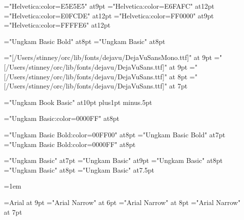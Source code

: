 


\font\hveee="Helvetica:color=E5E5E5" at9pt
\font\hveff="Helvetica:color=E6FAFC" at12pt
\font\hvefd="Helvetica:color=E0FCDE" at12pt
\font\hvfee="Helvetica:color=FF0000" at9pt
\font\hvffe="Helvetica:color=FFFFE6" at12pt

\let\seq\relax
\let\lname\relax
\let\sname\relax
\let\uname\relax
\let\chars\relax
\let\names\relax
\let\glyph\relax
\let\rglyf\relax
\let\image\relax
\let\notes\relax
\let\stags\relax
\let\fseq\relax
\let\fseqc\relax
\let\fseqh\relax
\let\sqdbcun\relax
\let\sqdbpua\relax
\let\sqseq\relax
\let\sqinv\relax
\let\sqchr\relax

\let\imagefloat\relax
\let\imagecaption\relax

\def\ucode#1{\sf\eight\rm}

\let\remfor\relax
\let\Hhhhh\relax

\let\glyf\relax
\let\fchr\relax
\let\fhex\relax
\let\dist\relax
\let\rhex\relax

\let\sl\relax
\let\slc\relax
\let\slcc\relax
\let\cdligh\relax
\let\zatu\relax
\def\diffc{\let\ofspc\relax\pcfee}
\def\diffd{\message{hvfee}\hvfee}

\font\slnmfont="Ungkam Basic Bold" at8pt
\font\sltgfont="Ungkam Basic" at8pt

\font\mono="[/Users/stinney/orc/lib/fonts/dejavu/DejaVuSansMono.ttf]" at 9pt
\font\sans="[/Users/stinney/orc/lib/fonts/dejavu/DejaVuSans.ttf]" at 9pt
\font\sansb="[/Users/stinney/orc/lib/fonts/dejavu/DejaVuSans.ttf]" at 8pt
\font\sansc="[/Users/stinney/orc/lib/fonts/dejavu/DejaVuSans.ttf]" at 7pt

\font\mainfont="Ungkam Book Basic" at10pt
\baselineskip12pt plus1pt minus.5pt

\font\blungkam="Ungkam Basic:color=0000FF" at8pt

\font\slnmfontw="Ungkam Basic Bold:color=00FF00" at8pt
\font\slnmfontx="Ungkam Basic Bold" at7pt
\font\slnmfonty="Ungkam Basic Bold:color=0000FF" at8pt

\font\akafont="Ungkam Basic" at7pt
\font\sldistfont="Ungkam Basic" at9pt
\font\oidfont="Ungkam Basic" at8pt
\font\oidfontx="Ungkam Basic" at8pt
\font\zatufont="Ungkam Basic" at7.5pt

\oidfont{}=1em %

\font\helv=Arial at 9pt
\font\helvx="Arial Narrow" at 6pt
\font\helvy="Arial Narrow" at 8pt
\font\helvz="Arial Narrow" at 7pt

